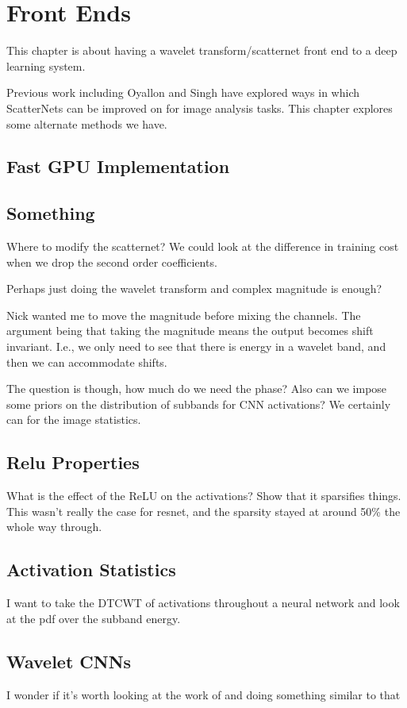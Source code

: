 \chapter{Front Ends}

This chapter is about having a wavelet transform/scatternet front end to a deep
learning system.

Previous work including Oyallon and Singh have explored ways in which
ScatterNets can be improved on for image analysis tasks. This chapter explores
some alternate methods we have.

\section{Fast GPU Implementation}

\section{Something}
Where to modify the scatternet? We could look at the difference in training cost
when we drop the second order coefficients.

Perhaps just doing the wavelet transform and complex magnitude is enough?

Nick wanted me to move the magnitude before mixing the channels. The argument
being that taking the magnitude means the output becomes shift invariant. I.e.,
we only need to see that there is energy in a wavelet band, and then we can
accommodate shifts.

The question is though, how much do we need the phase? Also can we impose some
priors on the distribution of subbands for CNN activations? We certainly can for
the image statistics.

\section{Relu Properties}
What is the effect of the ReLU on the activations? Show that it sparsifies
things. This wasn't really the case for resnet, and the sparsity stayed at around 50\% the whole way
through.

\section{Activation Statistics}
I want to take the DTCWT of activations throughout a neural network and look at
the pdf over the subband energy.

\section{Wavelet CNNs}
I wonder if it's worth looking at the work of \cite{fujieda_wavelet_2018} and doing something
similar to that 
